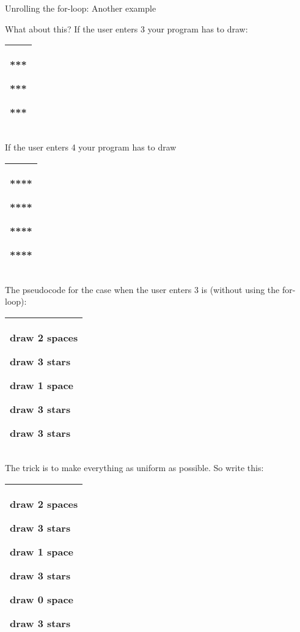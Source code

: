 \documentclass[
]{article}
\begin{document}
Unrolling the for-loop: Another example

What about this? If the user enters 3 your program has to draw:

\begin{longtable}[]{@{}l@{}}
\toprule
\endhead
\begin{minipage}[t]{0.97\columnwidth}\raggedright
***

***

***\strut
\end{minipage}\tabularnewline
\bottomrule
\end{longtable}

If the user enters 4 your program has to draw

\begin{longtable}[]{@{}l@{}}
\toprule
\endhead
\begin{minipage}[t]{0.97\columnwidth}\raggedright
****

****

****

****\strut
\end{minipage}\tabularnewline
\bottomrule
\end{longtable}

The pseudocode for the case when the user enters 3 is (without using the
for-loop):

\begin{longtable}[]{@{}l@{}}
\toprule
\endhead
\begin{minipage}[t]{0.97\columnwidth}\raggedright
draw 2 spaces

draw 3 stars

draw 1 space

draw 3 stars

draw 3 stars\strut
\end{minipage}\tabularnewline
\bottomrule
\end{longtable}

The trick is to make everything as uniform as possible. So write this:

\begin{longtable}[]{@{}l@{}}
\toprule
\endhead
\begin{minipage}[t]{0.97\columnwidth}\raggedright
draw 2 spaces

draw 3 stars

draw 1 space

draw 3 stars

draw 0 space

draw 3 stars\strut
\end{minipage}\tabularnewline
\bottomrule
\end{longtable}
\end{document}

